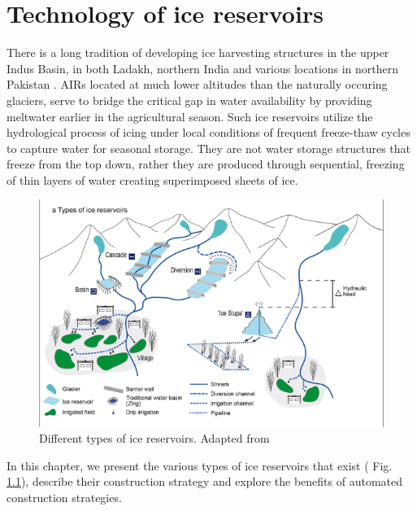 \chapter{Technology of ice reservoirs}
\label{chap:tech}


There is a long tradition of developing ice harvesting structures in the upper Indus Basin, in both Ladakh,
northern India \citep{labbalTraditionalOasesLadakh2000, nusserIrrigationDevelopmentUpper2012} and various
locations in northern Pakistan \citep{kreutzmannScarcityOpulenceWater2011}. AIRs located at much lower altitudes
than the naturally occuring glaciers, serve to bridge the critical gap in water availability by providing
meltwater earlier in the agricultural season. Such ice reservoirs utilize the hydrological process of icing
under local conditions of frequent freeze-thaw cycles to capture water for seasonal storage. They are not water
storage structures that freeze from the top down, rather they are produced through sequential, freezing of thin
layers of water creating superimposed sheets of ice.

\begin{figure}[htb]
\centering
\includegraphics[width=\textwidth]{figs/AIR_designs}
\caption{Different types of ice reservoirs. Adapted from \cite{nusserSociohydrologyArtificialGlaciers2019}}
\label{fig:AIRdesigns}
\end{figure}

In this chapter, we present the various types of ice reservoirs that exist ( Fig. \ref{fig:AIRdesigns}),
describe their construction strategy and explore the benefits of automated construction strategies.


